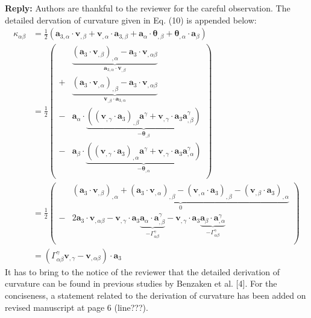\documentclass{article}
\begin{document}
\textbf{Reply:} Authors are thankful to the reviewer for the careful observation. The detailed dervation of curvature given in Eq. (10) is appended below:
\begin{equation}
    \begin{split}
        \kappa_{\alpha\beta} &=\frac{1}{2}(\boldsymbol a_{3,\alpha} \cdot \boldsymbol v_{,\beta} + \boldsymbol v_{,\alpha} \cdot \boldsymbol a_{3,\beta} + \boldsymbol a_\alpha \cdot \boldsymbol \theta_{,\beta} + \boldsymbol \theta_{,\alpha} \cdot \boldsymbol a_\beta) \\
        &=\frac{1}{2} \left ( 
        \begin{split}
            &\underbrace{(\boldsymbol a_3 \cdot \boldsymbol v_{,\beta})_{,\alpha} - \boldsymbol a_3 \cdot \boldsymbol v_{,\alpha\beta}}_{\boldsymbol a_{3,\alpha} \cdot \boldsymbol v_{,\beta}} \\
            +&\underbrace{(\boldsymbol a_3 \cdot \boldsymbol v_{,\alpha})_{,\beta} - \boldsymbol a_3 \cdot \boldsymbol v_{,\alpha\beta}}_{\boldsymbol v_{,\beta} \cdot \boldsymbol a_{3,\alpha}} \\
            -& \boldsymbol a_\alpha \cdot \underbrace{((\boldsymbol v_{,\gamma} \cdot \boldsymbol a_3)_{,\beta} \boldsymbol a^\gamma + \boldsymbol v_{,\gamma} \cdot \boldsymbol a_3 \boldsymbol a^\gamma_{,\beta})}_{-\boldsymbol \theta_{,\beta}} \\
            -& \boldsymbol a_\beta \cdot \underbrace{((\boldsymbol v_{,\gamma} \cdot \boldsymbol a_3)_{,\alpha} \boldsymbol a^\gamma + \boldsymbol v_{,\gamma} \cdot \boldsymbol a_3 \boldsymbol a^\gamma_{,\alpha})}_{-\boldsymbol \theta_{,\alpha}} \\
        \end{split}
        \right ) \\
        &=\frac{1}{2} \left ( 
        \begin{split}
            &\underbrace{(\boldsymbol a_3 \cdot \boldsymbol v_{,\beta})_{,\alpha}
            +(\boldsymbol a_3 \cdot \boldsymbol v_{,\alpha})_{,\beta}
            -(\boldsymbol v_{,\alpha} \cdot \boldsymbol a_3)_{,\beta}
            -(\boldsymbol v_{,\beta} \cdot \boldsymbol a_3)_{,\alpha}}_{0} \\
            -&2\boldsymbol a_3 \cdot \boldsymbol v_{,\alpha\beta}
            - \boldsymbol v_{,\gamma} \cdot \boldsymbol a_3 \underbrace{\boldsymbol a_\alpha \cdot \boldsymbol a^\gamma_{,\beta}}_{-\Gamma_{\alpha\beta}^\gamma}
            - \boldsymbol v_{,\gamma} \cdot \boldsymbol a_3 \underbrace{\boldsymbol a_\beta \cdot \boldsymbol a^\gamma_{,\alpha}}_{-\Gamma_{\alpha\beta}^\gamma} \\
        \end{split}
        \right ) \\
        &= (\Gamma_{\alpha\beta}^\gamma \boldsymbol v_{,\gamma} - \boldsymbol v_{,\alpha\beta}) \cdot \boldsymbol a_3
    \end{split}
\end{equation}
It has to bring to the notice of the reviewer that the detailed derivation of curvature can be found in previous studies by Benzaken et al. [4]. For the conciseness, a statement related to the derivation of curvature has been added on revised manuscript at page 6 (line???). 
\end{document}
